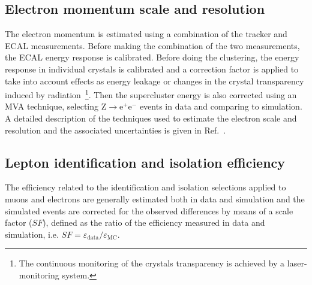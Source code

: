 \subsection{Electron momentum scale and resolution}
The electron momentum is estimated using a combination of the tracker and ECAL measurements. Before making the combination of the two measurements, the ECAL energy response is calibrated. Before doing the clustering, the energy response in individual crystals is calibrated and a correction factor is applied to take into account effects as energy leakage or changes in the crystal transparency induced by radiation~\footnote{The continuous monitoring of the crystals transparency is achieved by a laser-monitoring system.}. Then the supercluster energy is also corrected using an MVA technique, selecting $\mathrm{Z\to e^+ e^-}$ events in data and comparing to simulation. A detailed description of the techniques used to estimate the electron scale and resolution and the associated uncertainties is given in Ref.~\cite{Khachatryan:2015hwa}.



\subsection{Lepton identification and isolation efficiency}\label{sec:lepIdIsoEff}
The efficiency related to the identification and isolation selections applied to muons and electrons are generally estimated both in data and simulation and the simulated events are corrected for the observed differences by means of a scale factor ($SF$), defined as the ratio of the efficiency measured in data and simulation, i.e. $SF = \varepsilon_\mathrm{data}/\varepsilon_\mathrm{MC}$.

